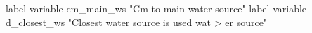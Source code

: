 label variable cm_main_ws "Cm to main water source"
label variable d_closest_ws "Closest water source is used wat
> er source" 
